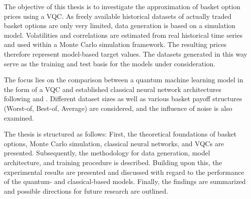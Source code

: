 The objective of this thesis is to investigate the approximation of basket option prices using a VQC. As freely available historical datasets of actually traded basket options are only very limited, data generation is based on a simulation model. Volatilities and correlations are estimated from real historical time series and used within a Monte Carlo simulation framework. The resulting prices therefore represent model-based target values. The datasets generated in this way serve as the training and test basis for the models under consideration.

The focus lies on the comparison between a quantum machine learning model in the form of a VQC and established classical neural network architectures following \cite{culkin2017machine} and \cite{ferguson2018deeply}. Different dataset sizes as well as various basket payoff structures (Worst-of, Best-of, Average) are considered, and the influence of noise is also examined.

The thesis is structured as follows:
First, the theoretical foundations of basket options, Monte Carlo simulation, classical neural networks, and VQCs are presented. Subsequently, the methodology for data generation, model architecture, and training procedure is described. Building upon this, the experimental results are presented and discussed with regard to the performance of the quantum- and classical-based models. Finally, the findings are summarized and possible directions for future research are outlined.